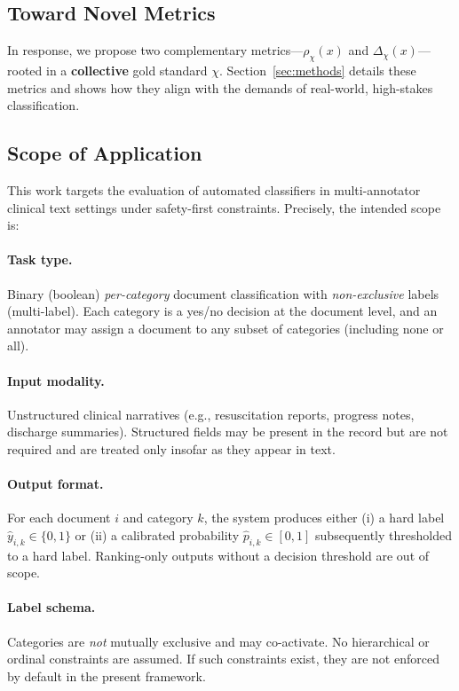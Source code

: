 \documentclass[12pt]{article}
\begin{document}
\subsection{Toward Novel Metrics}
In response, we propose two complementary metrics---\(\rho_{\chi}(x)\) and \(\Delta_{\chi}(x)\)---rooted in a \textbf{collective} gold standard \(\chi\). Section~\ref{sec:methods} details these metrics and shows how they align with the demands of real-world, high-stakes classification.

\subsection{Scope of Application}
\label{sec:scope}

This work targets the evaluation of automated classifiers in multi-annotator clinical text settings under safety-first constraints. Precisely, the intended scope is:

\paragraph{Task type.}
Binary (boolean) \emph{per-category} document classification with \emph{non-exclusive} labels (multi-label). Each category is a yes/no decision at the document level, and an annotator may assign a document to any subset of categories (including none or all).

\paragraph{Input modality.}
Unstructured clinical narratives (e.g., resuscitation reports, progress notes, discharge summaries). Structured fields may be present in the record but are not required and are treated only insofar as they appear in text.

\paragraph{Output format.}
For each document $i$ and category $k$, the system produces either (i) a hard label $\hat{y}_{i,k}\in\{0,1\}$ or (ii) a calibrated probability $\hat{p}_{i,k}\in[0,1]$ subsequently thresholded to a hard label. Ranking-only outputs without a decision threshold are out of scope.

\paragraph{Label schema.}
Categories are \emph{not} mutually exclusive and may co-activate. No hierarchical or ordinal constraints are assumed. If such constraints exist, they are not enforced by default in the present framework.
\end{document}
